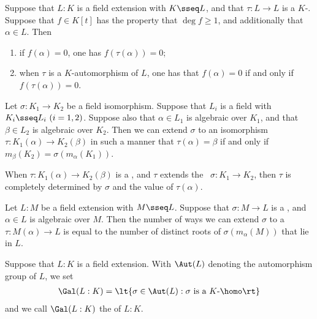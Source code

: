 \documentclass{article}
\begin{document}
  \begin{proposition}
    Suppose that $ L:K $ is a field extension with $ K\sseq L $, and that $ \tau:L\to L $ is a $ K $-\homo .
    Suppose that $ f\in K[t] $ has the property that $ \deg f \geq 1 $, and additionally that $ \alpha\in L $.
    Then \begin{enumerate}[label=(\roman*)]
      \item if $ f(\alpha) = 0 $, one has $ f(\tau(\alpha)) = 0 $;
      \item when $ \tau $ is a $ K $-automorphism of $ L $, one has that $ f(\alpha) = 0 $ if and only if $ f(\tau(\alpha)) = 0 $.
    \end{enumerate}
  \end{proposition}

  \begin{theorem}
    Let $ \sigma :K_1\to K_2 $ be a field isomorphism.
    Suppose that $ L_i $ is a field with $ K_i\sseq L_i\ (i=1,2) $.
    Suppose also that $ \alpha\in L_1 $ is algebraic over $ K_1 $, and that $ \beta\in L_2 $ is algebraic over $ K_2 $.
    Then we can extend $ \sigma $ to an isomorphism $ \tau:K_1(\alpha)\to K_2(\beta) $ in such a manner that $ \tau(\alpha) = \beta $ if and only if $ m_\beta(K_2) = \sigma(m_\alpha(K_1)) $.
  \end{theorem}

  \quad When $ \tau:K_1(\alpha)\to K_2(\beta) $ is a \homo, and $ \tau $ extends the \homo~$ \sigma:K_1\to K_2 $, then $ \tau $ is completely determined by $ \sigma $ and the value of $ \tau(\alpha) $.

  \begin{corollary}
    Let $ L:M $ be a field extension with $ M\sseq L $. Suppose that $ \sigma:M\to L $ is a \homo, and $ \alpha\in L $ is algebraic over $ M $.
    Then the number of ways we can extend $ \sigma $ to a \homo~$ \tau:M(\alpha)\to L $ is equal to the number of distinct roots of $ \sigma(m_\alpha(M)) $ that lie in $ L $.
  \end{corollary}

  \begin{definition}
    Suppose that $ L:K $ is a field extension.
    With $ \Aut(L) $ denoting the automorphism group of $ L $, we set \begin{align*}
      \Gal(L:K) = \lt\{ \sigma\in \Aut(L) : \sigma \text{ is a $ K $-\homo} \rt\}
    \end{align*}
    and we call $ \Gal(L:K) $ the  of $ L:K $.
  \end{definition}
\end{document}
